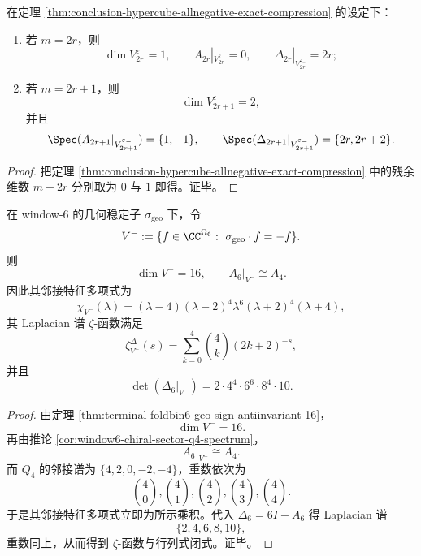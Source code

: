 \begin{corollary}[最深全负层的偶奇二歧]\label{cor:conclusion-hypercube-deepest-allnegative-evenodd}
在定理 \ref{thm:conclusion-hypercube-allnegative-exact-compression} 的设定下：
\begin{enumerate}
  \item 若 \(m=2r\)，则
  \[
  \dim V_{2r}^{\varepsilon_-}=1,
  \qquad
  A_{2r}|_{V_{2r}^{\varepsilon_-}}=0,
  \qquad
  \Delta_{2r}|_{V_{2r}^{\varepsilon_-}}=2r;
  \]
  \item 若 \(m=2r+1\)，则
  \[
  \dim V_{2r+1}^{\varepsilon_-}=2,
  \]
  并且
  \[
  \Spec(A_{2r+1}|_{V_{2r+1}^{\varepsilon_-}})=\{1,-1\},
  \qquad
  \Spec(\Delta_{2r+1}|_{V_{2r+1}^{\varepsilon_-}})=\{2r,2r+2\}.
  \]
\end{enumerate}
\end{corollary}
\begin{proof}
把定理 \ref{thm:conclusion-hypercube-allnegative-exact-compression} 中的残余维数 \(m-2r\) 分别取为 \(0\) 与 \(1\) 即得。证毕。
\end{proof}

\begin{theorem}\label{thm:conclusion-window6-canonical-chiral-zeta-determinant}
在 window-\(6\) 的几何稳定子 \(\sigma_{\mathrm{geo}}\) 下，令
\[
V^-:=\{f\in\CC^{\Omega_6}:\ \sigma_{\mathrm{geo}}\cdot f=-f\}.
\]
则
\[
\dim V^-=16,
\qquad
A_6|_{V^-}\cong A_4.
\]
因此其邻接特征多项式为
\[
\chi_{V^-}(\lambda)
=
(\lambda-4)(\lambda-2)^4\lambda^6(\lambda+2)^4(\lambda+4),
\]
其 Laplacian 谱 \(\zeta\)-函数满足
\[
\zeta_{V^-}^{\Delta}(s)
=
\sum_{k=0}^4 \binom{4}{k}(2k+2)^{-s},
\]
并且
\[
\det(\Delta_6|_{V^-})
=
2\cdot 4^4\cdot 6^6\cdot 8^4\cdot 10.
\]
\end{theorem}
\begin{proof}
由定理 \ref{thm:terminal-foldbin6-geo-sign-antiinvariant-16}，
\[
\dim V^-=16.
\]
再由推论 \ref{cor:window6-chiral-sector-q4-spectrum}，
\[
A_6|_{V^-}\cong A_4.
\]
而 \(Q_4\) 的邻接谱为 \(\{4,2,0,-2,-4\}\)，重数依次为
\[
\binom40,\binom41,\binom42,\binom43,\binom44.
\]
于是其邻接特征多项式立即为所示乘积。代入 \(\Delta_6=6I-A_6\) 得 Laplacian 谱
\[
\{2,4,6,8,10\},
\]
重数同上，从而得到 \(\zeta\)-函数与行列式闭式。证毕。
\end{proof}

